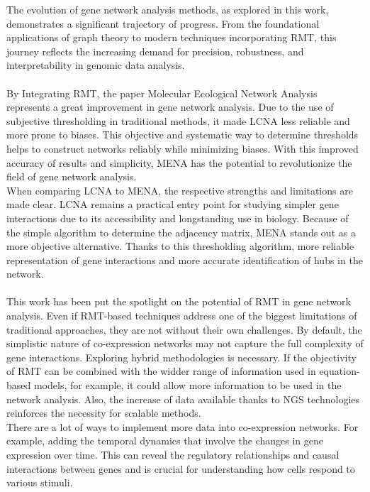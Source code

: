 The evolution of gene network analysis methods, as explored in this work, demonstrates a significant trajectory of progress.
From the foundational applications of graph theory to modern techniques incorporating RMT, this journey reflects the increasing demand for precision, robustness, and interpretability in genomic data analysis.
\\\\
\indent By Integrating RMT, the paper Molecular Ecological Network Analysis represents a great improvement in gene network analysis.
Due to the use of subjective thresholding in traditional methods, it made LCNA less reliable and more prone to biases.
This objective and systematic way to determine thresholds helps to construct networks reliably while minimizing biases.
With this improved accuracy of results and simplicity, MENA has the potential to revolutionize the field of gene network analysis.
\\
\noindent When comparing LCNA to MENA, the respective strengths and limitations are made clear.
LCNA remains a practical entry point for studying simpler gene interactions due to its accessibility and longstanding use in biology.
Because of the simple algorithm to determine the adjacency matrix, MENA stands out as a more objective alternative.
Thanks to this thresholding algorithm, more reliable representation of gene interactions and more accurate identification of hubs in the network.
\\\\
\indent This work has been put the spotlight on the potential of RMT in gene network analysis.
Even if RMT-based techniques address one of the biggest limitations of traditional approaches, they are not without their own challenges.
By default, the simplistic nature of co-expression networks may not capture the full complexity of gene interactions.
Exploring hybrid methodologies is necessary.
If the objectivity of RMT can be combined with the widder range of information used in equation-based models, for example, it could allow more information to be used in the network analysis.
Also, the increase of data available thanks to NGS technologies reinforces the necessity for scalable methods.
\\
\noindent There are a lot of ways to implement more data into co-expression networks.
For example, adding the temporal dynamics that involve the changes in gene expression over time.
This can reveal the regulatory relationships and causal interactions between genes and is crucial for understanding how cells respond to various stimuli.
